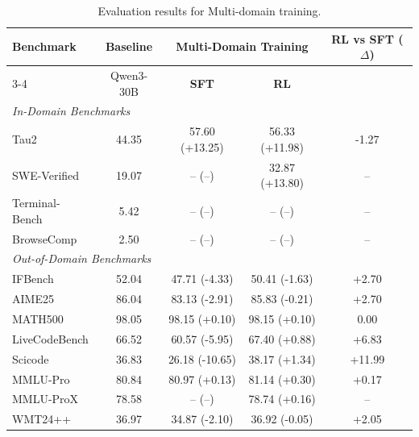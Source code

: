 \begin{table}[!t]
\centering
\small
\begin{tabular}{l c cc c}
\toprule
\multirow{2}{*}{\textbf{Benchmark}} 
& \multirow{2}{*}{\textbf{Baseline}} 
& \multicolumn{2}{c}{\textbf{Multi-Domain Training}}
& \multirow{2}{*}{\textbf{RL vs SFT ($\Delta$)}} \\
\cmidrule(lr){3-4}
& Qwen3-30B 
& \textbf{SFT} & \textbf{RL} & \\
\midrule
\midrule

\multicolumn{5}{l}{\textit{In-Domain Benchmarks}} \\
\midrule

Tau2 
& 44.35 
& 57.60 (+13.25) & 56.33 (+11.98) 
& -1.27 \\

SWE-Verified
& 19.07 
& -- \quad (--) & 32.87 (+13.80) 
& -- \\

Terminal-Bench
& 5.42 
& -- \quad (--) & -- \quad (--) 
& -- \\

BrowseComp
& 2.50 
& -- \quad (--) & -- \quad (--) 
& -- \\

\midrule
\multicolumn{5}{l}{\textit{Out-of-Domain Benchmarks}} \\
\midrule

IFBench 
& 52.04 
& 47.71 (-4.33)  & 50.41 (-1.63) 
& +2.70 \\

AIME25 
& 86.04 
& 83.13 (-2.91)  & 85.83 (-0.21) 
& +2.70 \\

MATH500 
& 98.05 
& 98.15 (+0.10)  & 98.15 (+0.10) 
& 0.00 \\

LiveCodeBench 
& 66.52 
& 60.57 (-5.95)  & 67.40 (+0.88) 
& +6.83 \\

Scicode 
& 36.83 
& 26.18 (-10.65) & 38.17 (+1.34) 
& +11.99 \\

MMLU-Pro 
& 80.84 
& 80.97 (+0.13)  & 81.14 (+0.30) 
& +0.17 \\

MMLU-ProX 
& 78.58 
& -- \quad (--)  & 78.74 (+0.16) 
& -- \\

WMT24++ 
& 36.97 
& 34.87 (-2.10)  & 36.92 (-0.05) 
& +2.05 \\

\bottomrule
\end{tabular}
\caption{Evaluation results for Multi-domain training.}
\label{tab:combined_training_results}
\end{table}

